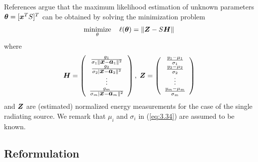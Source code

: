 References \cite{LiHu,ShengHu} argue that the maximum likelihood estimation of unknown parameters $\mbox{\boldmath${\theta}$} = [\mbox{\boldmath$x$}^T S]^T$ can be obtained by solving the minimization problem
\begin{equation} \label{eq:3.34}
\mathop{\mbox{minimize}}_\theta \quad \ell(\mbox{\boldmath${\theta}$}) = \|\mbox{\boldmath$Z$} - S\mbox{\boldmath$H$}\|
\end{equation}
where 
\begin{equation}
\nonumber
\mbox{\boldmath$H$} = \left( \begin{array}{c}
\frac{g_1}{\sigma_1\|\mbox{\boldmath$x$} - \mbox{\boldmath$a$}_1 \|^2} \\
\frac{g_2}{\sigma_2|\mbox{\boldmath$x$} - \mbox{\boldmath$a$}_2 \|^2} \\
\vdots \\
\frac{g_m}{\sigma_m|\mbox{\boldmath$x$} - \mbox{\boldmath$a$}_m \|^2} \\
\end{array}
\right) , \;
\nonumber
\mbox{\boldmath$Z$} = \left( \begin{array}{c}
\frac{y_1 - \mu_1}{\sigma_1} \\
\frac{y_2 - \mu_2}{\sigma_2} \\
\vdots \\
\frac{y_m - \mu_m}{\sigma_m} \\
\end{array}
\right)
\end{equation}
and $\mbox{\boldmath$Z$}$ are (estimated) normalized energy measurements for the case of the single radiating source. We remark that $\mu_i$ and $\sigma_i$ in (\ref{eq:3.34}) are assumed to be known. 


\subsection{Reformulation}


